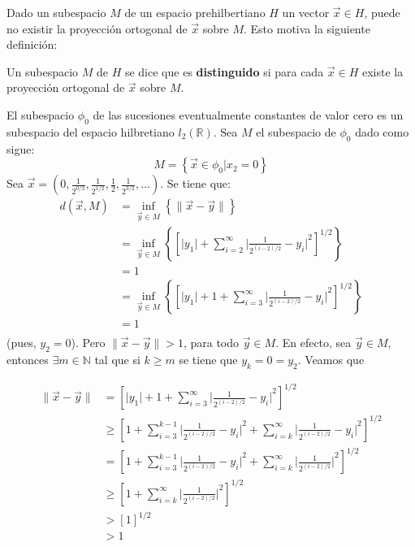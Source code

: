 \documentclass[12pt]{report}
\newcounter{it}
\theoremstyle{largebreak}
\newcommand\abs[1]{\ensuremath{\big|#1\big|}}
\newcommand\norm[1]{\ensuremath{\|#1\|}}
\begin{document}
    Dado un subespacio $M$ de un espacio prehilbertiano $H$ un vector $\vec{x}\in H$, puede no existir la proyección ortogonal de $\vec{x}$ sobre $M$. Esto motiva la siguiente definición:

    \begin{mydef}
        Un subespacio $M$ de $H$ se dice que es \textbf{distinguido} si para cada $\vec{x}\in H$ existe la proyección ortogonal de $\vec{x}$ sobre $M$.        
    \end{mydef}

    \begin{exa}
        El subespacio $\phi_0$ de las sucesiones eventualmente constantes de valor cero es un subespacio del espacio hilbretiano $l_2(\mathbb{R})$. Sea $M$ el subespacio de $\phi_0$ dado como sigue:
        \begin{equation*}
            M=\left\{\vec{x}\in\phi_0|x_2=0 \right\}
        \end{equation*}
        Sea $\vec{x}=\left(0,\frac{1}{2^{0/2}},\frac{1}{2^{1/2}},\frac{1}{2},\frac{1}{2^{3/2}},... \right)$. Se tiene que:
        \begin{equation*}
            \begin{split}
                d(\vec{x},M)&=\inf_{\vec{y}\in M}\left\{\norm{\vec{x}-\vec{y}} \right\}\\
                &=\inf_{\vec{y}\in M}\left\{\left[\abs{y_1}+\sum_{i=2}^{\infty} \abs{\frac{1}{2^{(i-2)/2}}-y_i}^2 \right]^{1/2} \right\}\\
                &=1\\
                &=\inf_{\vec{y}\in M}\left\{\left[\abs{y_1}+1+\sum_{i=3}^{\infty} \abs{\frac{1}{2^{(i-2)/2}}-y_i}^2 \right]^{1/2} \right\}\\
                &=1\\
            \end{split}
        \end{equation*}
        (pues, $y_2=0$). Pero $\norm{\vec{x}-\vec{y}}>1$, para todo $\vec{y}\in M$. En efecto, sea $\vec{y}\in M$, entonces $\exists m\in\mathbb{N}$ tal que si $k\geq m$ se tiene que $y_k=0=y_2$. Veamos que

        \begin{equation*}
            \begin{split}
                \norm{\vec{x}-\vec{y}}&=\left[\abs{y_1}+1+\sum_{i=3}^{\infty} \abs{\frac{1}{2^{(i-2)/2}}-y_i}^2 \right]^{1/2}\\
                &\geq \left[1+\sum_{i=3}^{k-1} \abs{\frac{1}{2^{(i-2)/2}}-y_i}^2 + \sum_{i=k}^{\infty} \abs{\frac{1}{2^{(i-2)/2}}-y_i}^2 \right]^{1/2}\\
                &= \left[1+\sum_{i=3}^{k-1} \abs{\frac{1}{2^{(i-2)/2}}-y_i}^2 + \sum_{i=k}^{\infty} \abs{\frac{1}{2^{(i-2)/2}}}^2 \right]^{1/2}\\
                &\geq \left[1+\sum_{i=k}^{\infty} \abs{\frac{1}{2^{(i-2)/2}}}^2 \right]^{1/2}\\
                &> \left[1\right]^{1/2}\\
                &> 1\\
            \end{split}
        \end{equation*}
        

\end{exa}
\end{document}
